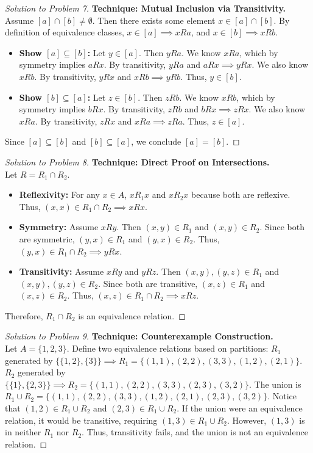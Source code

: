 \documentclass[11pt, a4paper]{article}
\theoremstyle{definition}
\theoremstyle{remark}
\begin{document}
\begin{proof}[Solution to Problem 7]
    \textbf{Technique: Mutual Inclusion via Transitivity.} \\
    Assume $[a] \cap [b] \neq \emptyset$. Then there exists some element $x \in [a] \cap [b]$. By definition of equivalence classes, $x \in [a] \implies xRa$, and $x \in [b] \implies xRb$.
    \begin{itemize}
        \item \textbf{Show $[a] \subseteq [b]$:} Let $y \in [a]$. Then $yRa$. We know $xRa$, which by symmetry implies $aRx$. By transitivity, $yRa$ and $aRx \implies yRx$. We also know $xRb$. By transitivity, $yRx$ and $xRb \implies yRb$. Thus, $y \in [b]$.
        \item \textbf{Show $[b] \subseteq [a]$:} Let $z \in [b]$. Then $zRb$. We know $xRb$, which by symmetry implies $bRx$. By transitivity, $zRb$ and $bRx \implies zRx$. We also know $xRa$. By transitivity, $zRx$ and $xRa \implies zRa$. Thus, $z \in [a]$.
    \end{itemize}
    Since $[a] \subseteq [b]$ and $[b] \subseteq [a]$, we conclude $[a] = [b]$.
\end{proof}

\begin{proof}[Solution to Problem 8]
    \textbf{Technique: Direct Proof on Intersections.} \\
    Let $R = R_1 \cap R_2$.
    \begin{itemize}
        \item \textbf{Reflexivity:} For any $x \in A$, $xR_1x$ and $xR_2x$ because both are reflexive. Thus, $(x,x) \in R_1 \cap R_2 \implies xRx$.
        \item \textbf{Symmetry:} Assume $xRy$. Then $(x,y) \in R_1$ and $(x,y) \in R_2$. Since both are symmetric, $(y,x) \in R_1$ and $(y,x) \in R_2$. Thus, $(y,x) \in R_1 \cap R_2 \implies yRx$.
        \item \textbf{Transitivity:} Assume $xRy$ and $yRz$. Then $(x,y), (y,z) \in R_1$ and $(x,y), (y,z) \in R_2$. Since both are transitive, $(x,z) \in R_1$ and $(x,z) \in R_2$. Thus, $(x,z) \in R_1 \cap R_2 \implies xRz$.
    \end{itemize}
    Therefore, $R_1 \cap R_2$ is an equivalence relation.
\end{proof}

\begin{proof}[Solution to Problem 9]
    \textbf{Technique: Counterexample Construction.} \\
    Let $A = \{1, 2, 3\}$. Define two equivalence relations based on partitions:
    $R_1$ generated by $\{\{1, 2\}, \{3\}\} \implies R_1 = \{(1,1), (2,2), (3,3), (1,2), (2,1)\}$.
    $R_2$ generated by $\{\{1\}, \{2, 3\}\} \implies R_2 = \{(1,1), (2,2), (3,3), (2,3), (3,2)\}$.
    The union is $R_1 \cup R_2 = \{(1,1), (2,2), (3,3), (1,2), (2,1), (2,3), (3,2)\}$.
    Notice that $(1,2) \in R_1 \cup R_2$ and $(2,3) \in R_1 \cup R_2$. If the union were an equivalence relation, it would be transitive, requiring $(1,3) \in R_1 \cup R_2$. However, $(1,3)$ is in neither $R_1$ nor $R_2$. Thus, transitivity fails, and the union is not an equivalence relation.
\end{proof}
\end{document}
